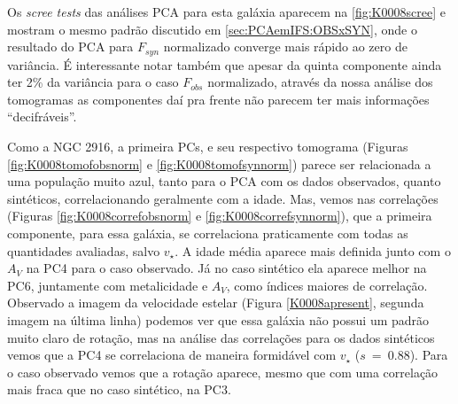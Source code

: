 Os {\em scree tests} das análises PCA para esta galáxia aparecem na \ref{fig:K0008scree} e mostram o mesmo padrão
discutido em \ref{sec:PCAemIFS:OBSxSYN}, onde o resultado do PCA para $F_{syn}$ normalizado converge mais rápido ao zero
de variância. É interessante notar também que apesar da quinta componente ainda ter 2\% da variância para o caso
$F_{obs}$ normalizado, através da nossa análise dos tomogramas as componentes daí pra frente não parecem ter mais
informações ``decifráveis''.

Como a NGC 2916, a primeira PCs, e seu respectivo tomograma (Figuras \ref{fig:K0008tomofobsnorm} e
\ref{fig:K0008tomofsynnorm}) parece ser relacionada a uma população muito azul, tanto para o PCA com os dados
observados, quanto sintéticos, correlacionando geralmente com a idade. Mas, vemos nas correlações (Figuras
\ref{fig:K0008correfobsnorm} e \ref{fig:K0008correfsynnorm}), que a primeira componente, para essa galáxia, se
correlaciona praticamente com todas as quantidades avaliadas, salvo $v_\star$. A idade média aparece mais definida junto
com o $A_V$ na PC4 para o caso observado. Já no caso sintético ela aparece melhor na PC6, juntamente com metalicidade e
$A_V$, como índices maiores de correlação. Observado a imagem da velocidade estelar (Figura \ref{K0008apresent}, segunda
imagem na última linha) podemos ver que essa galáxia não possui um padrão muito claro de rotação, mas na análise das
correlações para os dados sintéticos vemos que a PC4 se correlaciona de maneira formidável com $v_\star$ ($s\ =\ 0.88$).
Para o caso observado vemos que a rotação aparece, mesmo que com uma correlação mais fraca que no caso sintético, na PC3.

